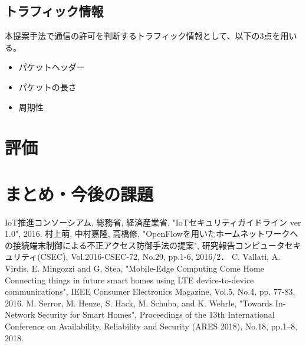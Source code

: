 \documentclass[a4paper,10pt,twocolumn,uplatex]{jsarticle}
\begin{document}
\subsection{トラフィック情報}
本提案手法で通信の許可を判断するトラフィック情報として、以下の3点を用いる。

\begin{itemize}
  \item パケットヘッダー
  \item パケットの長さ
  \item 周期性
\end{itemize}

\section{評価}

\section{まとめ・今後の課題}

\footnotesize{
  \begin{thebibliography}{99}
     IoT推進コンソーシアム, 総務省, 経済産業省, "IoTセキュリティガイドライン ver 1.0", 2016.
     村上萌, 中村嘉隆, 高橋修, "OpenFlowを用いたホームネットワークへの接続端末制御による不正アクセス防御手法の提案", 研究報告コンピュータセキュリティ(CSEC), Vol.2016-CSEC-72, No.29, pp.1-6, 2016/2．
     C. Vallati, A. Virdis, E. Mingozzi and G. Stea, "Mobile-Edge Computing Come Home Connecting things in future smart homes using LTE device-to-device communications", IEEE Consumer Electronics Magazine, Vol.5, No.4, pp. 77-83, 2016.
     M. Serror, M. Henze, S. Hack, M. Schuba, and K. Wehrle, "Towards In-Network Security for Smart Homes", Proceedings of the 13th International Conference on Availability, Reliability and Security (ARES 2018), No.18, pp.1–8, 2018.
  \end{thebibliography}
}

\end{document}

